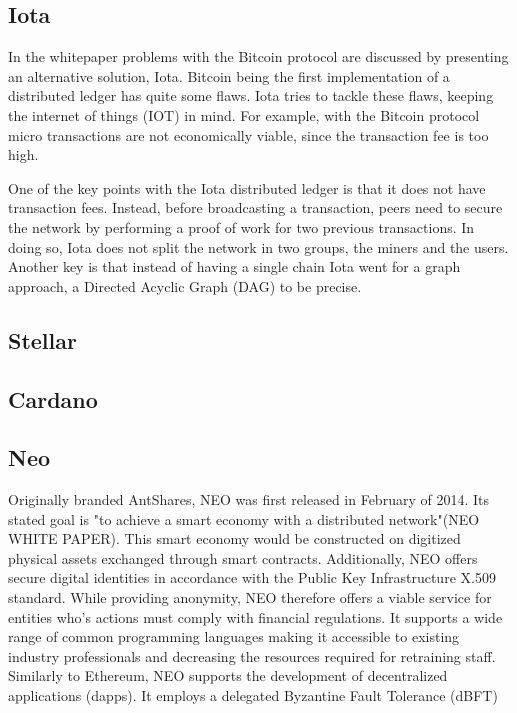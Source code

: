 

\subsection{Iota}
In the whitepaper \cite{iota_wp} problems with the Bitcoin protocol are discussed by presenting an alternative solution, Iota. Bitcoin being the first implementation of a distributed ledger has quite some flaws. Iota tries to tackle these flaws, keeping the internet of things (IOT) in mind. For example, with the Bitcoin protocol micro transactions are not economically viable, since the transaction fee is too high.

One of the key points with the Iota distributed ledger is that it does not have transaction fees. Instead, before broadcasting a transaction, peers need to secure the network by performing a proof of work for two previous transactions. In doing so, Iota does not split the network in two groups, the miners and the users. Another key is that instead of having a single chain Iota went for a graph approach, a Directed Acyclic Graph (DAG) to be precise.
\subsection{Stellar}

\subsection{Cardano}

\subsection{Neo}
Originally branded AntShares, NEO was first released in February of 2014. Its stated goal is "to achieve a smart economy with a distributed network"(NEO WHITE PAPER). This smart economy would be constructed on digitized physical assets exchanged through smart contracts. Additionally, NEO offers secure digital identities in accordance with the Public Key Infrastructure X.509 standard. While providing anonymity, NEO therefore offers a viable service for entities who’s actions must comply with financial regulations. It supports a wide range of common programming languages making it accessible to existing industry professionals and decreasing the resources required for retraining staff. Similarly to Ethereum, NEO supports the development of decentralized applications (dapps). It employs a delegated Byzantine Fault Tolerance (dBFT)
